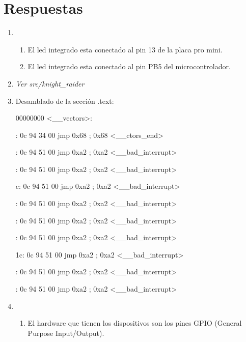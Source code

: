\chapter*{Respuestas}

\begin{enumerate}
      \item
            \begin{enumerate}[label=\arabic*]
                  \item El led integrado esta conectado al pin 13 de la placa pro mini.
                  \item El led integrado esta conectado al pin PB5 del microcontrolador.
            \end{enumerate}
      \item \textit{Ver src/knight\_raider}
      \item
            Desamblado de la sección .text:

            \vspace{0.3cm}

            00000000 <\_\_vectors>:

            : \quad 0c 94 34 00 \quad jmp \quad 0x68 \quad	; 0x68 <\_\_ctors\_end>

            : \quad 0c 94 51 00 \quad jmp \quad 0xa2	\quad ; 0xa2 <\_\_bad\_interrupt>

            : \quad 0c 94 51 00 \quad jmp \quad 0xa2	\quad ; 0xa2 <\_\_bad\_interrupt>

            \quad c: \quad 0c 94 51 00 \quad jmp \quad 0xa2	\quad ; 0xa2 <\_\_bad\_interrupt>

            : \quad 0c 94 51 00 \quad jmp \quad 0xa2 \quad ; 0xa2 <\_\_bad\_interrupt>

            : \quad 0c 94 51 00 \quad jmp \quad 0xa2 \quad ; 0xa2 <\_\_bad\_interrupt>

            : \quad 0c 94 51 00 \quad jmp \quad 0xa2 \quad ; 0xa2 <\_\_bad\_interrupt>

            \quad 1c: \quad 0c 94 51 00 \quad jmp \quad 0xa2 \quad ; 0xa2 <\_\_bad\_interrupt>

            : \quad 0c 94 51 00 \quad jmp \quad 0xa2 \quad ; 0xa2 <\_\_bad\_interrupt>

            : \quad 0c 94 51 00 \quad jmp \quad 0xa2 \quad ; 0xa2 <\_\_bad\_interrupt>
      \item
            \begin{enumerate}
                  \item
                        El hardware que tienen los dispositivos son los pines GPIO (General Purpose Input/Output).


\end{enumerate}
\end{enumerate}
